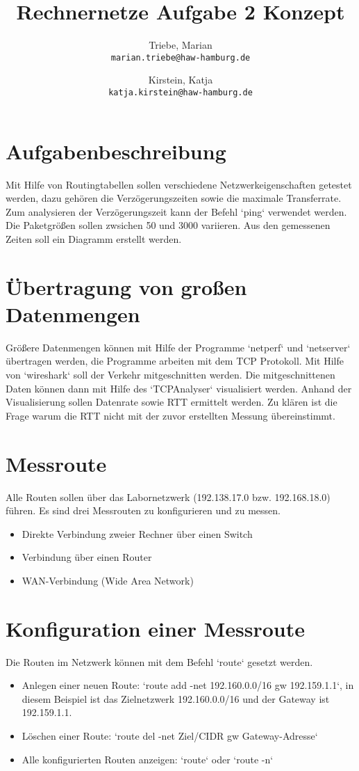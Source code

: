 \documentclass[a4paper,10pt]{article}
\title{Rechnernetze Aufgabe 2 Konzept}
\author{
  Triebe, Marian\\
  \texttt{marian.triebe@haw-hamburg.de}
  \and
  Kirstein, Katja\\
  \texttt{katja.kirstein@haw-hamburg.de}
}
\begin{document}
\maketitle

\section{Aufgabenbeschreibung}
Mit Hilfe von Routingtabellen sollen verschiedene Netzwerkeigenschaften getestet werden,
dazu geh\"oren die Verz\"ogerungszeiten sowie die maximale Transferrate.
Zum analysieren der Verz\"ogerungszeit kann der Befehl `ping` verwendet werden.
Die Paketgr\"o{\ss}en sollen zwsichen 50 und 3000 variieren. Aus den gemessenen Zeiten
soll ein Diagramm erstellt werden.

\section{\"Ubertragung von großen Datenmengen}
Gr\"o{\ss}ere Datenmengen k\"onnen mit Hilfe der Programme `netperf` und `netserver`
\"ubertragen werden, die Programme arbeiten mit dem TCP Protokoll. Mit Hilfe von
`wireshark` soll der Verkehr mitgeschnitten werden. Die mitgeschnittenen Daten k\"onnen
dann mit Hilfe des `TCPAnalyser` visualisiert werden. Anhand der Visualisierung sollen
Datenrate sowie RTT ermittelt werden. Zu kl\"aren ist die Frage warum die RTT nicht mit der
zuvor erstellten Messung \"ubereinstimmt.

\section{Messroute}
Alle Routen sollen \"uber das Labornetzwerk (192.138.17.0 bzw. 192.168.18.0) f\"uhren.
Es sind drei Messrouten zu konfigurieren und zu messen.
\begin{itemize}
 \item Direkte Verbindung zweier Rechner \"uber einen Switch
 \item Verbindung \"uber einen Router
 \item WAN-Verbindung (Wide Area Network)
\end{itemize}

\newpage

\section{Konfiguration einer Messroute}
Die Routen im Netzwerk k\"onnen mit dem Befehl `route` gesetzt werden.
\begin{itemize}
 \item Anlegen einer neuen Route: `route add -net 192.160.0.0/16 gw 192.159.1.1`,
 in diesem Beispiel ist das Zielnetzwerk 192.160.0.0/16 und der Gateway ist 192.159.1.1.
 \item L\"oschen einer Route: `route del -net Ziel/CIDR gw Gateway-Adresse`
 \item Alle konfigurierten Routen anzeigen: `route` oder `route -n`
\end{itemize}
\end{document}
